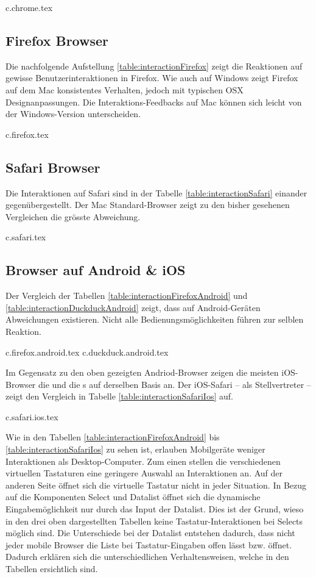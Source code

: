 {c.chrome.tex}


\clearpage
\subsection{Firefox Browser}
\label{sec:firefoxBrowser}

Die nachfolgende Aufstellung \ref{table:interactionFirefox} zeigt die Reaktionen auf gewisse Benutzerinteraktionen in Firefox. 
Wie auch auf Windows zeigt Firefox auf dem Mac konsistentes Verhalten, jedoch mit typischen OSX Designanpassungen. 
Die Interaktions-Feedbacks auf Mac können sich leicht von der Windows-Version unterscheiden. 

{c.firefox.tex}


\clearpage
\subsection{Safari Browser}
\label{sec:safariBrowser}

Die Interaktionen auf Safari sind in der Tabelle \ref{table:interactionSafari} einander gegenübergestellt. 
Der Mac Standard-Browser zeigt zu den bisher gesehenen Vergleichen die grösste Abweichung. 

{c.safari.tex}


\clearpage
\subsection{Browser auf Android \& iOS}
\label{sec:mobileBrowser}

Der Vergleich der Tabellen \ref{table:interactionFirefoxAndroid} und \ref{table:interactionDuckduckAndroid} zeigt, dass auf Android-Geräten Abweichungen existieren. 
Nicht alle Bedienungsmöglichkeiten führen zur selblen Reaktion. 

{c.firefox.android.tex}
{c.duckduck.android.tex}

\clearpage
Im Gegensatz zu den oben gezeigten Andriod-Browser zeigen die meisten iOS-Browser die  und die s auf derselben Basis an. 
Der iOS-Safari – als Stellvertreter – zeigt den Vergleich in Tabelle \ref{table:interactionSafariIos} auf. 

{c.safari.ios.tex}

Wie in den Tabellen \ref{table:interactionFirefoxAndroid} bis \ref{table:interactionSafariIos} zu sehen ist, erlauben Mobilgeräte weniger Interaktionen als Desktop-Computer. 
Zum einen stellen die verschiedenen virtuellen Tastaturen eine geringere Auswahl an Interaktionen an. 
Auf der anderen Seite öffnet sich die virtuelle Tastatur nicht in jeder Situation. 
In Bezug auf die Komponenten Select und Datalist öffnet sich die dynamische Eingabemöglichkeit nur durch das Input der Datalist. 
Dies ist der Grund, wieso in den drei oben dargestellten Tabellen keine Tastatur-Interaktionen bei Selects möglich sind. 
Die Unterschiede bei der Datalist entstehen dadurch, dass nicht jeder mobile Browser die Liste bei Tastatur-Eingaben offen lässt bzw. öffnet. 
Dadurch erklären sich die unterschiedlichen Verhaltensweisen, welche in den Tabellen ersichtlich sind. 

